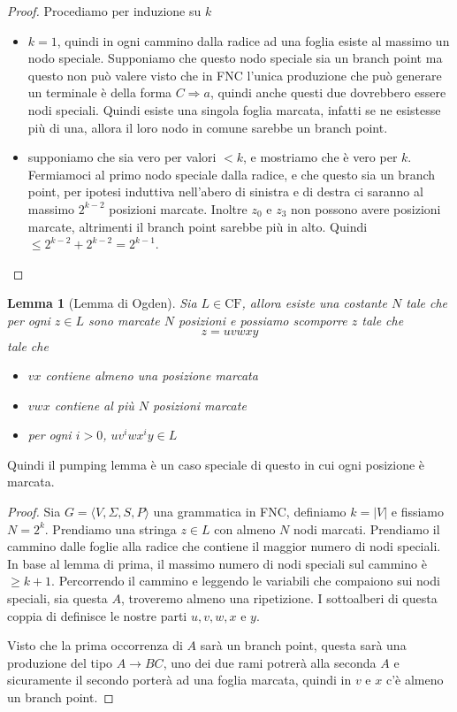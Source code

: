 \documentclass[12pt]{report}
\newtheorem{lemma}{Lemma}
\theoremstyle{definition}
\theoremstyle{regard}
\begin{document}
% 
\begin{proof}
 	Procediamo per induzione su $k$
 	\begin{itemize}
 		\item $k = 1$, quindi in ogni cammino dalla radice ad una foglia esiste al massimo un nodo speciale.
 			Supponiamo che questo nodo speciale sia un branch point
 			ma questo non può valere visto che in FNC l'unica produzione che può generare un terminale è della forma $C \Rightarrow a$, quindi anche questi due dovrebbero essere nodi speciali.
 			Quindi esiste una singola foglia marcata, infatti se ne esistesse più di una, allora il loro nodo in comune sarebbe un branch point.
 		\item supponiamo che sia vero per valori $< k$, e mostriamo che è vero per $k$.
 			Fermiamoci al primo nodo speciale dalla radice, e che questo sia un branch point, per ipotesi induttiva nell'abero di sinistra e di destra ci saranno al massimo $2^{k - 2}$ posizioni marcate.
 			Inoltre $z_0$ e $z_3$ non possono avere posizioni marcate, altrimenti il branch point sarebbe più in alto.
 			Quindi $\leq 2^{k - 2} + 2^{k - 2} = 2^{k - 1}$.
	\end{itemize}
\end{proof}

\begin{lemma}[Lemma di Ogden]
	\label{lemma:ogden}
	Sia $L \in \text{CF}$, allora esiste una costante $N$ tale che per ogni $z \in L$ sono marcate $N$ posizioni e possiamo scomporre $z$ tale che
	$$ z = u v w x y $$
	tale che
	\begin{itemize}
		\item $vx$ contiene almeno una posizione marcata
		\item $vwx$ contiene al più $N$ posizioni marcate
		\item per ogni $i > 0$, $u v^i w x^i y \in L$
	\end{itemize}
\end{lemma}
Quindi il pumping lemma è un caso speciale di questo in cui ogni posizione è marcata.
\begin{proof}
	Sia $G = \langle V, \Sigma, S, P \rangle$ una grammatica in FNC, definiamo $k = |V|$ e fissiamo $N = 2^k$.
	Prendiamo una stringa $z \in L$ con almeno $N$ nodi marcati.
	Prendiamo il cammino dalle foglie alla radice che contiene il maggior numero di nodi speciali.
	In base al lemma di prima, il massimo numero di nodi speciali sul cammino è $\geq k + 1$.
	Percorrendo il cammino e leggendo le variabili che compaiono sui nodi speciali, sia questa $A$, troveremo almeno una ripetizione.
	I sottoalberi di questa coppia di definisce le nostre parti $u, v, w, x$ e $y$.

	Visto che la prima occorrenza di $A$ sarà un branch point, questa sarà una produzione del tipo $A \rightarrow BC$, uno dei due rami potrerà alla seconda $A$ e sicuramente il secondo porterà ad una foglia marcata, quindi in $v$ e $x$ c'è almeno un branch point.
\end{proof}
\end{document}
